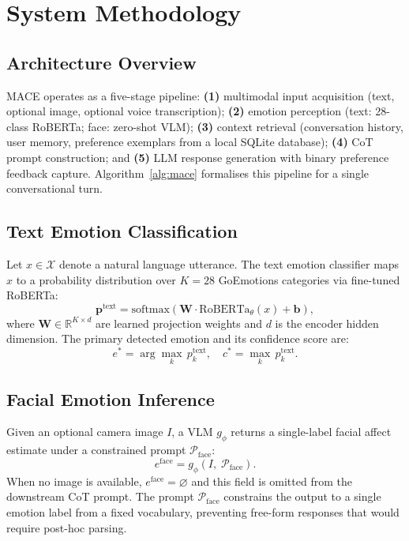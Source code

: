 \documentclass[sigconf, review=true]{acmart}
\begin{document}
\section{System Methodology}
\label{sec:methodology}

\subsection{Architecture Overview}

MACE operates as a five-stage pipeline:
\textbf{(1)} multimodal input acquisition (text, optional image,
optional voice transcription);
\textbf{(2)} emotion perception (text: 28-class RoBERTa;
face: zero-shot VLM);
\textbf{(3)} context retrieval (conversation history, user memory,
preference exemplars from a local SQLite database);
\textbf{(4)} CoT prompt construction; and
\textbf{(5)} LLM response generation with binary preference
feedback capture.
Algorithm~\ref{alg:mace} formalises this pipeline for a single
conversational turn.

\subsection{Text Emotion Classification}

Let $x \in \mathcal{X}$ denote a natural language utterance.
The text emotion classifier maps $x$ to a probability
distribution over $K{=}28$ GoEmotions categories via fine-tuned
RoBERTa:
\begin{equation}
    \mathbf{p}^{\text{text}} = \text{softmax}\!\left(
    \mathbf{W} \cdot \text{RoBERTa}_\theta(x) + \mathbf{b}
    \right),
    \label{eq:text_emotion}
\end{equation}
where $\mathbf{W} \in \mathbb{R}^{K \times d}$ are learned
projection weights and $d$ is the encoder hidden dimension.
The primary detected emotion and its confidence score are:
\begin{equation}
    e^* = \arg\max_{k} \, p^{\text{text}}_k, \quad
    c^* = \max_{k} \, p^{\text{text}}_k.
    \label{eq:primary_emotion}
\end{equation}

\subsection{Facial Emotion Inference}

Given an optional camera image $I$, a VLM $g_\phi$ returns a
single-label facial affect estimate under a constrained
prompt $\mathcal{P}_{\text{face}}$:
\begin{equation}
    e^{\text{face}} = g_\phi\!\left(I,\; \mathcal{P}_{\text{face}}\right).
    \label{eq:face_emotion}
\end{equation}
When no image is available, $e^{\text{face}}{=}\varnothing$ and
this field is omitted from the downstream CoT prompt.
The prompt $\mathcal{P}_{\text{face}}$ constrains the output to a
single emotion label from a fixed vocabulary, preventing
free-form responses that would require post-hoc parsing.
\end{document}

